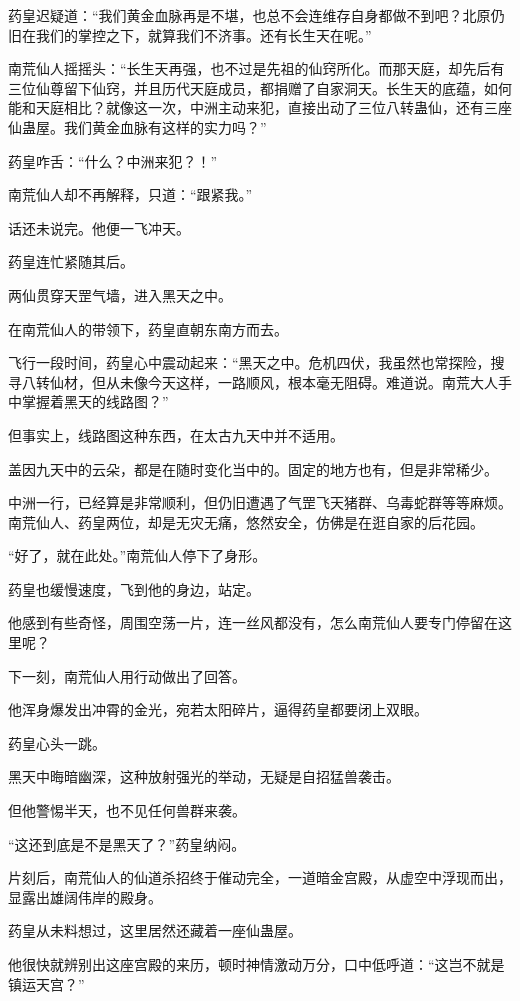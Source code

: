 \begin{this_body}
药皇迟疑道：“我们黄金血脉再是不堪，也总不会连维存自身都做不到吧？北原仍旧在我们的掌控之下，就算我们不济事。还有长生天在呢。”

南荒仙人摇摇头：“长生天再强，也不过是先祖的仙窍所化。而那天庭，却先后有三位仙尊留下仙窍，并且历代天庭成员，都捐赠了自家洞天。长生天的底蕴，如何能和天庭相比？就像这一次，中洲主动来犯，直接出动了三位八转蛊仙，还有三座仙蛊屋。我们黄金血脉有这样的实力吗？”

药皇咋舌：“什么？中洲来犯？！”

南荒仙人却不再解释，只道：“跟紧我。”

话还未说完。他便一飞冲天。

药皇连忙紧随其后。

两仙贯穿天罡气墙，进入黑天之中。

在南荒仙人的带领下，药皇直朝东南方而去。

飞行一段时间，药皇心中震动起来：“黑天之中。危机四伏，我虽然也常探险，搜寻八转仙材，但从未像今天这样，一路顺风，根本毫无阻碍。难道说。南荒大人手中掌握着黑天的线路图？”

但事实上，线路图这种东西，在太古九天中并不适用。

盖因九天中的云朵，都是在随时变化当中的。固定的地方也有，但是非常稀少。

中洲一行，已经算是非常顺利，但仍旧遭遇了气罡飞天猪群、乌毒蛇群等等麻烦。南荒仙人、药皇两位，却是无灾无痛，悠然安全，仿佛是在逛自家的后花园。

“好了，就在此处。”南荒仙人停下了身形。

药皇也缓慢速度，飞到他的身边，站定。

他感到有些奇怪，周围空荡一片，连一丝风都没有，怎么南荒仙人要专门停留在这里呢？

下一刻，南荒仙人用行动做出了回答。

他浑身爆发出冲霄的金光，宛若太阳碎片，逼得药皇都要闭上双眼。

药皇心头一跳。

黑天中晦暗幽深，这种放射强光的举动，无疑是自招猛兽袭击。

但他警惕半天，也不见任何兽群来袭。

“这还到底是不是黑天了？”药皇纳闷。

片刻后，南荒仙人的仙道杀招终于催动完全，一道暗金宫殿，从虚空中浮现而出，显露出雄阔伟岸的殿身。

药皇从未料想过，这里居然还藏着一座仙蛊屋。

他很快就辨别出这座宫殿的来历，顿时神情激动万分，口中低呼道：“这岂不就是镇运天宫？”


\end{this_body}

